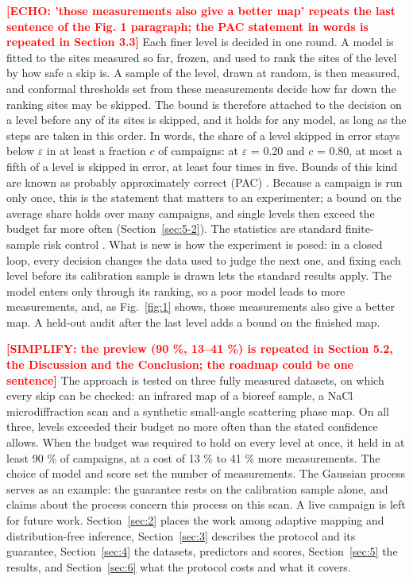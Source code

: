 \documentclass{iopjournal}
\newcommand{\ask}[1]{\textcolor{red}{\textbf{[#1]}}}
\begin{document}
\ask{ECHO: 'those measurements also give a better map' repeats the last sentence of the Fig. 1 paragraph; the PAC statement in words is repeated in Section 3.3} Each finer level is decided in one round. A model is fitted to the sites measured so far, frozen, and used to rank the sites of the level by how safe a skip is. A sample of the level, drawn at random, is then measured, and conformal thresholds set from these measurements decide how far down the ranking sites may be skipped. The bound is therefore attached to the decision on a level before any of its sites is skipped, and it holds for any model, as long as the steps are taken in this order. In words, the share of a level skipped in error stays below \ensuremath{\varepsilon} in at least a fraction $c$ of campaigns: at \ensuremath{\varepsilon} = 0.20 and $c$ = 0.80, at most a fifth of a level is skipped in error, at least four times in five. Bounds of this kind are known as probably approximately correct (PAC) \cite{Valiant1984}. Because a campaign is run only once, this is the statement that matters to an experimenter; a bound on the average share holds over many campaigns, and single levels then exceed the budget far more often (Section~\ref{sec:5-2}). The statistics are standard finite-sample risk control \cite{Vovk2005,Bates2021,Angelopoulos2025}. What is new is how the experiment is posed: in a closed loop, every decision changes the data used to judge the next one, and fixing each level before its calibration sample is drawn lets the standard results apply. The model enters only through its ranking, so a poor model leads to more measurements, and, as Fig.~\ref{fig:1} shows, those measurements also give a better map. A held-out audit after the last level adds a bound on the finished map.

\ask{SIMPLIFY: the preview (90 \%, 13--41 \%) is repeated in Section 5.2, the Discussion and the Conclusion; the roadmap could be one sentence} The approach is tested on three fully measured datasets, on which every skip can be checked: an infrared map of a bioreef sample, a NaCl microdiffraction scan \cite{ALSNaCl} and a synthetic small-angle scattering phase map. On all three, levels exceeded their budget no more often than the stated confidence allows. When the budget was required to hold on every level at once, it held in at least 90 \% of campaigns, at a cost of 13 \% to 41 \% more measurements. The choice of model and score set the number of measurements. The Gaussian process serves as an example: the guarantee rests on the calibration sample alone, and claims about the process concern this process on this scan. A live campaign is left for future work. Section~\ref{sec:2} places the work among adaptive mapping and distribution-free inference, Section~\ref{sec:3} describes the protocol and its guarantee, Section~\ref{sec:4} the datasets, predictors and scores, Section~\ref{sec:5} the results, and Section~\ref{sec:6} what the protocol costs and what it covers.
\end{document}
